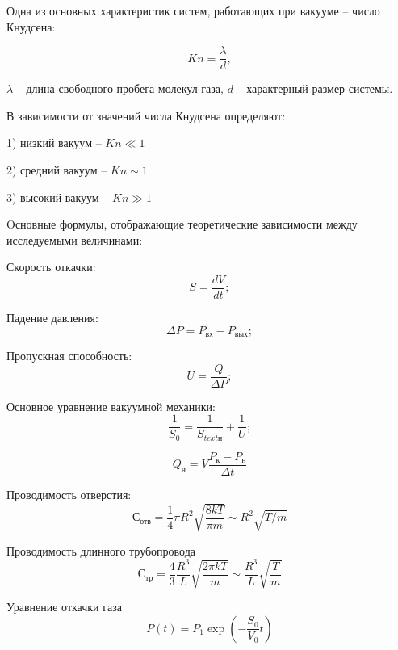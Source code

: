\documentclass[12pt,a4paper]{article}
\begin{document}
Одна из основных характеристик систем, работающих при вакууме -- число Кнудсена:
	
	\begin{equation}
		Kn = \frac{\lambda}{d}, 
	\end{equation}

	$\lambda$ -- длина свободного пробега молекул газа, $d$ -- характерный размер системы.
	
	В зависимости от значений числа Кнудсена определяют:
	
	1) низкий вакуум -- $Kn \ll 1$
	
	2) средний вакуум -- $Kn \sim 1$
	
	3) высокий вакуум -- $Kn \gg 1$
	
	Oсновные формулы, отображающие теоретические зависимости между исследуемыми величинами:
	
	
		Скорость откачки:
	\begin{equation}
		S = \frac{dV}{dt};
	\end{equation}	
	
		Падение давления:
	\begin{equation}
		\Delta P = P_{\text{вх}} - P_{\text{вых}};
	\end{equation}
		
		Пропускная способность:
	\begin{equation}
		U = \frac{Q}{\Delta P};
	\end{equation}
	
		Основное уравнение вакуумной механики:
	\begin{equation}
		\frac{1}{S_{0}} = \frac{1}{S_{text{н}}} + \frac{1}{U};
	\end{equation} 
	
	\begin{equation}
		Q_{\text{н}} = V\frac{P_{\text{к}} - P_{\text{н}}}{\Delta t}		
	\end{equation}
	
		Проводимость отверстия:
	\begin{equation}
		С_{\text{отв}} = \frac{1}{4} \pi R^{2} \sqrt{\frac{8kT}{\pi m}} \sim R^{2}\sqrt{T/m}
	\end{equation}
	
		Проводимость длинного трубопровода
	\begin{equation}
		С_{\text{тр}} = \frac{4}{3} \frac{R^{3}}{L} \sqrt{\frac{2\pi kT}{m}} \sim \frac{R^{3}}{L} \sqrt{\frac{T}{m}} 
	\end{equation}
	
		Уравнение откачки газа
	\begin{equation}
		P\left( t \right) = P_{1}\exp \left(- \frac{S_{0}}{V_{0}}t \right)
	\end{equation}
\end{document}

